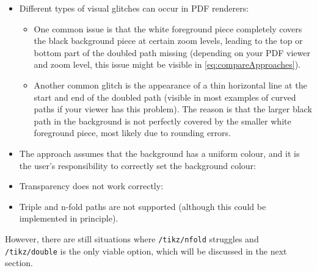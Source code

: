 \documentclass[12pt,a4paper]{article}
\theoremstyle{definition}
\newcommand{\tikzdouble}{\texttt{/tikz/double}}
\newcommand{\tikznfold}{\texttt{/tikz/nfold}}
\begin{document}
\begin{itemize}[beginpenalty=10000]
  \item Different types of visual glitches can occur in PDF renderers:
  \begin{itemize}
    \item One common issue is that the white foreground piece completely covers the black background piece at certain zoom levels, leading to the top or bottom part of the doubled path missing (depending on your PDF viewer and zoom level, this issue might be visible in \cref{eq:compareApproaches}).
    \item Another common glitch is the appearance of a thin horizontal line at the start and end of the doubled path (visible in most examples of curved paths if your viewer has this problem). The reason is that the larger black path in the background is not perfectly covered by the smaller white foreground piece, most likely due to rounding errors.
  \end{itemize}
  \item The approach assumes that the background has a uniform colour, and it is the user's responsibility to correctly set the background colour:
\begin{tkzexample}[latex=3.5cm]
\end{tkzexample}
  \item Transparency does not work correctly:
\begin{tkzexample}[latex=3.5cm]
\end{tkzexample}
  \item Triple and n-fold paths are not supported (although this could be implemented in principle).
\end{itemize}
However, there are still situations where \tikznfold{} struggles and \tikzdouble{} is the only viable option, which will be discussed in the next section.
\end{document}

